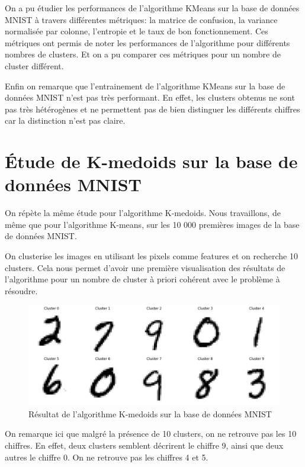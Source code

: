 \documentclass[french,a4paper,18pt]{article}
\begin{document}
On a pu étudier les performances de l'algorithme KMeans sur la base de données MNIST à travers
différentes métriques: la matrice de confusion, la variance normalisée par colonne, l'entropie et le taux de bon fonctionnement.
Ces métriques ont permis de noter les performances de l'algorithme pour différents nombres de clusters.
Et on a pu comparer ces métriques pour un nombre de cluster différent.

Enfin on remarque que l'entrainement de l'algorithme KMeans sur la base de données MNIST n'est pas très performant.
En effet, les clusters obtenus ne sont pas très hétérogènes et ne permettent pas de bien distinguer les différents chiffres
car la distinction n'est pas claire.


\section{Étude de K-medoids sur la base de données MNIST}

On répète la même étude pour l'algorithme K-medoids. Nous travaillons, de même que pour l'algorithme K-means, 
sur les 10 000 premières images de la base de données MNIST.

On clusterise les images en utilisant les pixels comme features et on recherche 10 clusters.
Cela nous permet d'avoir une première visualisation des résultats de l'algorithme pour un nombre 
de cluster à priori cohérent avec le problème à résoudre.

\begin{figure}[h!]
    \centering
    \includegraphics[scale=0.25]{images/mnist_kmedoids_ten_clusters.png}
    \caption{Résultat de l'algorithme K-medoids sur la base de données MNIST}\label{fig:mnist_kmedoids}
\end{figure}

On remarque ici que malgré la présence de 10 clusters, on ne retrouve pas les 10 chiffres.
En effet, deux clusters semblent décrirent le chiffre 9, ainsi que deux autres le chiffre 0.
On ne retrouve pas les chiffres 4 et 5.
\end{document}
